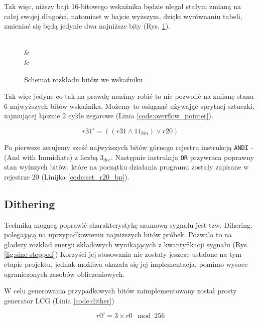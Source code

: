 \documentclass[12pt, a4paper]{article}
\begin{document}
Tak więc, niższy bajt 16-bitowego wskaźnika będzie ulegał stałym zmianą na całej swojej długości,
natomiast w bajcie wyższym, dzięki wyrównaniu tabeli, zmieniać się będą jedynie dwa najniższe bity (Rys. \ref{fig:bits_ex}).

\begin{figure}[h]
	\centering
	\hfill

	\begin{bytefield}[bitwidth=7mm,endianness=big]{16}
		 \\
		 & \\
		 & \\
	\end{bytefield}
	\caption{Schemat rozkładu bitów we wskaźniku}
	\label{fig:bits_ex}
\end{figure}

Tak więc jedyne co tak na prawdę musimy robić to nie pozwolić na zmianę stanu 6 najwyższych bitów wskaźnika.
Możemy to osiągnąć używając sprytnej sztuczki, zajmującej łącznie 2 cykle zegarowe (Linia \ref{code:overflow_pointer}).

\begin{equation}
	r31' = \left( \left( r31 \land 11_{bin} \right) \lor r20 \right)
\end{equation}

Po pierwsze zerujemy sześć najwyższych bitów górnego rejestru instrukcją \verb|ANDI| - (And with Immidiate) z liczbą $3_{dec}$.
Następnie instrukcja \verb|OR| przywraca poprawny stan wyższych bitów, 
które na początku działania programu zostały zapisane w rejestrze 20 (Linijka \ref{code:set_r20_bp}).


\iffalse
\subsection{Dithering}
Techniką mogącą poprawić charakterystykę szumową sygnału jest tzw. Dihering. polegającą na uprzypadkowieniu najniższych bitów próbek.
Pozwala to na gładszy rozkład energii składowych wynikających z kwantyfikacji sygnału (Rys. \ref{fig:sine-stepped})
Korzyści jej stosowania nie zostały jeszcze ustalone na tym etapie projektu, jednak możliwa okazała się jej implementacja,
pomimo wysoce ograniczonych zasobów obliczeniowych.

W celu generowania przypadkowych bitów zaimplementowany został prosty generator LCG (Linia \ref{code:dither})

\begin{equation}
	r0'=3 \times r0 \mod 256
\end{equation}
\end{document}
